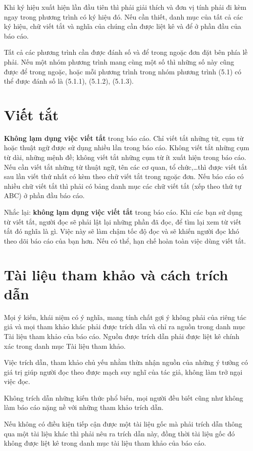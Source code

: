 Khi ký hiệu xuất hiện lần đầu tiên thì phải giải thích và đơn vị tính phải đi kèm ngay trong phương trình có ký hiệu đó.
Nếu cần thiết, danh mục của tất cả các ký hiệu, chữ viết tắt và nghĩa của chúng cần được liệt kê và để ở phần đầu của báo cáo.

Tất cả các phương trình cần được đánh số và để trong ngoặc đơn đặt bên phía lề phải.
Nếu một nhóm phương trình mang cùng một số thì những số này cũng được để trong ngoặc, hoặc mỗi phương trình trong nhóm phương trình (5.1) có thể được đánh số là (5.1.1), (5.1.2), (5.1.3).

\section{Viết tắt}

\textbf{Không lạm dụng việc viết tắt} trong báo cáo.
Chỉ viết tắt những từ, cụm từ hoặc thuật ngữ được sử dụng nhiều lần trong báo cáo.
Không viết tắt những cụm từ  dài, những mệnh đề; không viết tắt những cụm từ ít xuất hiện trong báo cáo.
Nếu cần viết tắt những từ thuật ngữ, tên các cơ quan, tổ chức,\ldots thì được viết tắt sau lần viết thứ nhất có kèm theo chữ viết tắt trong ngoặc đơn.
Nếu báo cáo có nhiều chữ viết tắt thì phải có bảng danh mục các chữ viết tắt (xếp theo thứ tự ABC) ở phần đầu báo cáo.

Nhắc lại: \textbf{không lạm dụng việc viết tắt} trong báo cáo.
Khi các bạn sử dụng từ viết tắt, người đọc sẽ phải lật lại những phần đã đọc, để tìm lại xem từ viết tắt đó nghĩa là gì.
Việc này sẽ làm chậm tốc độ đọc và sẽ khiến người đọc khó theo dõi báo cáo của bạn hơn.
Nếu có thể, hạn chế hoàn toàn việc dùng viết tắt.

\section{Tài liệu tham khảo và cách trích dẫn}

Mọi ý kiến, khái niệm có ý nghĩa, mang tính chất gợi ý không phải của riêng tác giả và mọi tham khảo khác phải được trích dẫn và chỉ ra nguồn trong danh mục Tài liệu tham khảo của báo cáo. Nguồn được trích dẫn phải được liệt kê chính xác trong danh mục Tài liệu tham khảo.

Việc trích dẫn, tham khảo chủ yếu nhằm thừa nhận nguồn của những ý tưởng có giá trị giúp người đọc theo được mạch suy nghĩ của tác giả, không làm trở ngại việc đọc.


Không trích dẫn những kiến thức phổ biến, mọi người đều biết cũng như không làm báo cáo nặng nề với những tham khảo trích dẫn.

Nếu không có điều kiện tiếp cận được một tài liệu gốc mà phải trích dẫn thông qua một tài liệu khác thì phải nêu ra trích dẫn này, đồng thời tài liệu gốc đó không được liệt kê trong danh mục tài liệu tham khảo của báo cáo.
